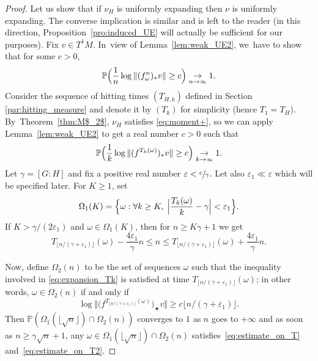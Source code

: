 \documentclass[11pt]{article}
\let\sep :
\let\e\varepsilon
\newcommand{\Bset}[1]{\Bigl\{#1\Bigr\}}
\newcommand{\norm}[1]{{\left\Vert#1\right\Vert}}
\newcommand{\anorm}[1]{{\Vert#1\Vert}}
\newcommand{\bnorm}[1]{{\bigl\Vert#1\bigr\Vert}}
\newcommand{\Babs}[1]{\Bigl\vert#1\Bigr\vert}
\newcommand{\unsur}[1]{\frac{1}{#1}}
\newcommand{\alrpar}[1]{(#1)}
\newcommand{\blrpar}[1]{\bigl(#1\bigr)}
\newcommand{\Blrpar}[1]{\Bigl(#1\Bigr)}
\newcommand{\pp}{\mathbb{P}}\let\P\pp
\theoremstyle{plain}
\theoremstyle{definition}
\numberwithin{equation}{section}
\begin{document}
\begin{proof}
Let us show that if $\nu_H$ is uniformly expanding then $\nu$ is uniformly expanding.
The converse implication is similar and is left to the reader (in
this direction, Proposition~\ref{pro:induced_UE} will actually be sufficient for our purposes).
Fix $ v\in T^1M$. In~view of Lemma~\ref{lem:weak_UE2}, we~have to show that for some $c>0$,
\begin{equation*}\label{eq:expansion_n}
\pp\Blrpar{ \unsur{n}\log \norm{ (f^n_\omega)_\varstar v} \geq c}
\underset{n\to\infty}{\to} 1.
\end{equation*}
Consider the sequence of hitting times $(T_{H,k})$ defined in Section \ref{par:hitting_measure} and
denote it by $(T_k)$
for simplicity (hence $T_1=T_H$). By~Theorem~\ref{thm:M$_2$},
$\nu_H$ satisfies \eqref{eq:moment+}, so we can apply
Lemma~\ref{lem:weak_UE2} to get a real number $c>0$ such that
\begin{equation}\label{eq:expansion_Tk}
\pp\Blrpar{ \unsur{k} \log\anorm{\alrpar{f^{T_{k}(\omega)}}_\varstar v} \geq c} \underset{k\to\infty}{\to} 1.
\end{equation}
Let $\gamma = [G:H]$ and fix a positive real number
$\e < \sfrac{c}{\gamma}$. Let also $\e_1\ll\e$ which will be specified later.
For $K\geq 1$, set
\begin{equation*}
\Omega_1(K)=\Bset{ \omega \sep  \forall k\geq K, \; \Babs{\frac{T_k(\omega)}{k} -\gamma} < \e_1 }.
\end{equation*}
If $K>\gamma/(2\e_1)$ and $\omega\in \Omega_1(K)$, then for $n\geq K\gamma+1$ we get
\begin{equation}\label{eq:estimate_on_T}
T_{\lfloor n/(\gamma+\e_1)\rfloor}(\omega)- \frac{4\e_1}{\gamma}n \leq n \leq T_{\lfloor n/(\gamma+\e_1)\rfloor}(\omega)+ \frac{4\e_1}{\gamma}n.
\end{equation}

Now, define $\Omega_2(n )$ to be the set of sequences $\omega$ such that
the inequality involved in \eqref{eq:expansion_Tk} is satisfied at time $T_{\lfloor n/(\gamma+\e_1)\rfloor}(\omega)$; in other words, $\omega\in \Omega_2(n)$ if and only if
\begin{equation}\label{eq:estimate_on_T2}
\log\bnorm{\blrpar{f^{T_{\lfloor n/(\gamma+\e_1)\rfloor}(\omega)}}_\varstar v} \geq c \lfloor n/(\gamma+\e_1)\rfloor.
\end{equation}
Then $\pp(\Omega_1(\lfloor\sqrt{n}\rfloor)\cap \Omega_2(n))$ converges to $1$ as $n$ goes to $+\infty$
and as soon as $n\geq \gamma\sqrt{n}+1$, any $\omega\in \Omega_1(\lfloor\sqrt{n}\rfloor)\cap \Omega_2(n)$
satisfies~\eqref{eq:estimate_on_T} and~\eqref{eq:estimate_on_T2}.


\end{proof}
\end{document}
